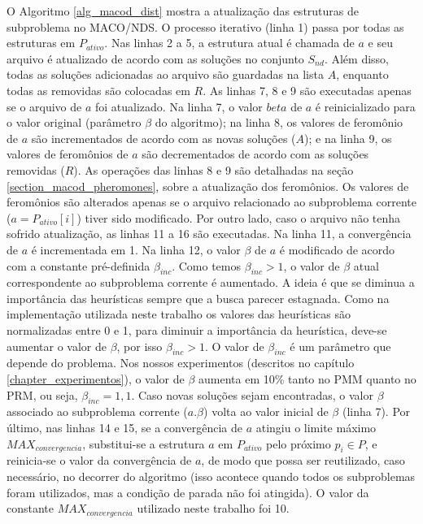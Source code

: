 O Algoritmo \ref{alg_macod_dist} mostra a atualização das estruturas de subproblema no MACO/NDS. O processo iterativo (linha 1) passa por todas as estruturas em $P_{ativo}$. Nas linhas 2 a 5, a estrutura atual é chamada de $a$ e seu arquivo é atualizado de acordo com as soluções no conjunto $S_{nd}$. Além disso, todas as soluções adicionadas ao arquivo são guardadas na lista $A$, enquanto todas as removidas são colocadas em $R$. As linhas 7, 8 e 9 são executadas apenas se o arquivo de $a$ foi atualizado. Na linha 7, o valor $beta$ de $a$ é reinicializado para o valor original (parâmetro $\beta$ do algoritmo); na linha 8, os valores de feromônio de $a$ são incrementados de acordo com as novas soluções ($A$); e na linha 9, os valores de feromônios de $a$ são decrementados de acordo com as soluções removidas ($R$). As operações das linhas 8 e 9 são detalhadas na seção \ref{section_macod_pheromones}, sobre a atualização dos feromônios. Os valores de feromônios são alterados apenas se o arquivo relacionado ao subproblema corrente ($a = P_{ativo}[i]$) tiver sido modificado. Por outro lado, caso o arquivo não tenha sofrido atualização, as linhas 11 a 16 são executadas. Na linha 11, a convergência de $a$ é incrementada em 1. Na linha 12, o valor $\beta$ de $a$ é modificado de acordo com a constante pré-definida $\beta_{inc}$. Como temos $\beta_{inc} > 1$, o valor de $\beta$ atual correspondente ao subproblema corrente é aumentado. A ideia é que se diminua a importância das heurísticas sempre que a busca parecer estagnada. Como na implementação utilizada neste trabalho os valores das heurísticas são normalizadas entre 0 e 1, para diminuir a importância da heurística, deve-se aumentar o valor de $\beta$, por isso $\beta_{inc} > 1$. O valor de $\beta_{inc}$ é um parâmetro que depende do problema. Nos nossos experimentos (descritos no capítulo \ref{chapter_experimentos}), o valor de $\beta$ aumenta em 10\% tanto no PMM quanto no PRM, ou seja, $\beta_{inc} = 1,1$. Caso novas soluções sejam encontradas, o valor $\beta$ associado ao subproblema corrente ($a.\beta$) volta ao valor inicial de $\beta$ (linha 7). Por último, nas linhas 14 e 15, se a convergência de $a$ atingiu o limite máximo $MAX_{convergencia}$, substitui-se a estrutura $a$ em $P_{ativo}$ pelo próximo $p_i \in P$, e reinicia-se o valor da convergência de $a$, de modo que possa ser reutilizado, caso necessário, no decorrer do algoritmo (isso acontece quando todos os subproblemas foram utilizados, mas a condição de parada não foi atingida). O valor da constante $MAX_{convergencia}$ utilizado neste trabalho foi 10.

